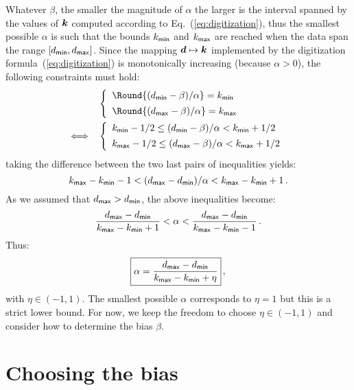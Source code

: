 \documentclass[]{article}
\begin{document}
Whatever $\beta$, the smaller the magnitude of $\alpha$ the larger is the
interval spanned by the values of $\boldsymbol{k}$ computed according to
Eq.~(\ref{eq:digitization}), thus the smallest possible $\alpha$ is such that
the bounds $k_{\mathsf{min}}$ and $k_{\mathsf{max}}$ are reached when the data span the
range $[d_{\mathsf{min}},d_{\mathsf{max}}]$.  Since the mapping $\boldsymbol{d} \mapsto \boldsymbol{k}$
implemented by the digitization formula~(\ref{eq:digitization}) is
monotonically increasing (because $\alpha > 0$), the following constraints must
hold:
\begin{align}
   &\left\{
   \begin{array}{l}
   \Round{(d_\Tag{min} - \beta)/\alpha} = k_\Tag{min} \\[1ex]
   \Round{(d_\Tag{max} - \beta)/\alpha} = k_\Tag{max}
   \end{array}\right. \notag  \\
   \Longleftrightarrow \quad
   &\left\{
   \begin{array}{l}
   k_\Tag{min} - 1/2 \le (d_\Tag{min} - \beta)/\alpha < k_\Tag{min} + 1/2 \\[1ex]
   k_\Tag{max} - 1/2 \le (d_\Tag{max} - \beta)/\alpha < k_\Tag{max} + 1/2
   \end{array}\right.
   \label{eq:bounds}
\end{align}
taking the difference between the two last pairs of inequalities yields:
\begin{displaymath}
  k_{\mathsf{max}} - k_{\mathsf{min}} - 1 < (d_{\mathsf{max}} - d_{\mathsf{min}})/\alpha <
  k_{\mathsf{max}} - k_{\mathsf{min}} + 1 \, .
\end{displaymath}
As we assumed that $d_{\mathsf{max}} > d_{\mathsf{min}}$, the above inequalities become:
\begin{displaymath}
  \frac{d_{\mathsf{max}} - d_{\mathsf{min}}}{k_{\mathsf{max}} - k_{\mathsf{min}} + 1}
  < \alpha <
  \frac{d_{\mathsf{max}} - d_{\mathsf{min}}}{k_{\mathsf{max}} - k_{\mathsf{min}} - 1} \, .
\end{displaymath}
Thus:
\begin{equation}
  \label{eq:best-alpha}
  \boxed{
    \alpha = \frac{d_{\mathsf{max}} - d_{\mathsf{min}}}
    {k_{\mathsf{max}} - k_{\mathsf{min}} + \eta}
  } \, ,
\end{equation}
with $\eta \in (-1,1)$.  The smallest possible $\alpha$ corresponds to $\eta =
1$ but this is a strict lower bound.  For now, we keep the freedom to choose
$\eta \in (-1,1)$ and consider how to determine the bias $\beta$.


\section{Choosing the bias}
\end{document}
